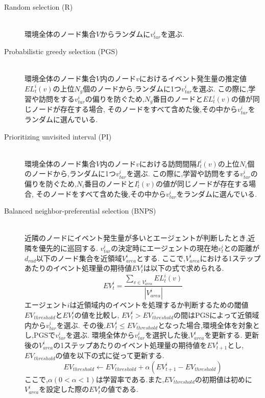 \documentclass[12pt,a4j,twoside]{jarticle}
\begin{document}
\begin{description}
  \item[Random selection (R)]\mbox{}\\
  環境全体のノード集合$V$からランダムに$v^i_{tar}$を選ぶ.

  \item[Probabilistic greedy selection (PGS)]\mbox{} \\
  環境全体のノード集合$V$内のノード$v$におけるイベント発生量の推定値$EL^i_t(v)$の上位$N_g$個のノードから,ランダムに1つ$v^i_{tar}$を選ぶ.
  この際に,学習や訪問をする$v^i_{tar}$の偏りを防ぐため,$N_g$番目のノードと$EL^i_t(v)$の値が同じノードが存在する場合,
  そのノードをすべて含めた後,その中から$v^i_{tar}$をランダムに選んでいる.

  \item[Prioritizing unvisited interval (PI)]\mbox{} \\
  環境全体のノード集合$V$内のノード$v$における訪問間隔$I^i_t(v)$の上位$N_i$個のノードから,ランダムに1つ$v^i_{tar}$を選ぶ.
  この際に,学習や訪問をする$v^i_{tar}$の偏りを防ぐため,$N_i$番目のノードと$I^i_t(v)$の値が同じノードが存在する場合,
  そのノードをすべて含めた後,その中から$v^i_{tar}$をランダムに選んでいる.
  
  \item[Balanced neighbor-preferential selection (BNPS)]\mbox{} \\
  近隣のノードにイベント発生量が多いとエージェントが判断したとき,近隣を優先的に巡回する.
  $v^i_{tar}$の決定時にエージェントの現在地$v^i_t$との距離が$d_{rad}$以下のノード集合を近領域$V^i_{area}$とする.
  ここで,$V^i_{area}$における1ステップあたりのイベント処理量の期待値$EV^i_t$は以下の式で求められる.
  \begin{equation}
    EV^i_t = \frac{\displaystyle \sum_{v \in V^i_{area}}EL^i_t(v)}{|V^i_{area}|}  
  \end{equation}
  エージェント$i$は近領域内のイベントを処理するか判断するための閾値$EV_{threshold}$と$EV^i_t$の値を比較し,
  $EV^i_t > EV_{threshold}$の間はPGSによって近領域内から$v^i_{tar}$を選ぶ.
  その後,$EV^i_t \le EV_{threshold}$となった場合,環境全体を対象とし,PGSで$v^i_{tar}$を選ぶ.
  環境全体から$v^i_{tar}$を選択した後,$V^i_{area}$を更新する.
  更新後の$V^i_{area}$の1ステップあたりのイベント処理量の期待値を$EV^i_{t+1}$とし,$EV_{threshold}$の値を以下の式に従って更新する.
  \begin{equation}
    EV_{threshold} \gets EV_{threshold} + \alpha(EV^i_{t+1} - EV_{threshold})
  \end{equation}
  ここで,$\alpha(0 < \alpha < 1)$は学習率である.また,$EV_{threshold}$の初期値は初めに$V^i_{area}$を設定した際の$EV^i_t$の値である.
\end{description}
\end{document}
